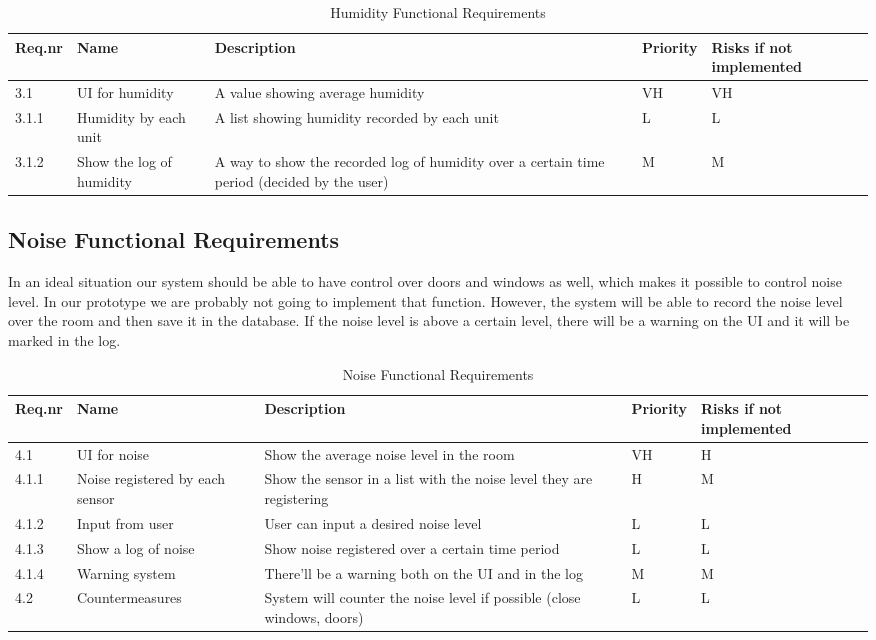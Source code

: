 \documentclass[../document]{subfiles}
\begin{document}
\begin{table}[H]
\caption{Humidity Functional Requirements}
\centering
\begin{tabularx}{\textwidth}{|l|X|X|l|X|}
\hline
Req.nr
&Name
&Description
&Priority
&Risks if not implemented
\\ \hline 3.1
&UI for humidity
&A value showing average humidity
&VH
&VH
\\ \hline 3.1.1
&Humidity by each unit
&A list showing humidity recorded by each unit
&L
&L
\\ \hline 3.1.2
&Show the log of humidity
&A way to show the recorded log of humidity over a certain time period (decided by the user)
&M
&M
\\ \hline 
\end{tabularx}
\end{table}

\subsection{Noise Functional Requirements}
In an ideal situation our system should be able to have control over doors and windows as well, which makes it possible to control noise level. In our prototype we are probably not going to implement that function. However, the system will be able to record the noise level over the room and then save it in the database. If the noise level is above a certain level, there will be a warning on the UI and it will be marked in the log.

\begin{table}[H]
\caption{Noise Functional Requirements}
\centering
\begin{tabularx}{\textwidth}{|l|X|X|l|X|}
\hline
Req.nr
&Name
&Description
&Priority
&Risks if not implemented
\\ \hline 4.1
&UI for noise
&Show the average noise level in the room
&VH
&H
\\ \hline 4.1.1
&Noise registered by each sensor
&Show the sensor in a list with the noise level they are registering
&H
&M
\\ \hline 4.1.2
&Input from user
&User can input a desired noise level 
&L
&L
\\ \hline 4.1.3
&Show a log of noise
&Show noise registered over a certain time period
&L
&L
\\ \hline 4.1.4
&Warning system
&There’ll be a warning both on the UI and in the log
&M
&M
\\ \hline 4.2
&Countermeasures
&System will counter the noise level if possible (close windows, doors)
&L
&L
\\ \hline 
\end{tabularx}
\end{table}
\end{document}
